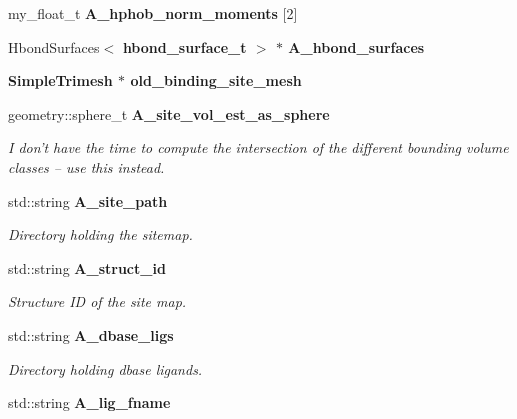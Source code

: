 \begin{CompactItemize}
\item 
my\_\-float\_\-t \textbf{A\_\-hphob\_\-norm\_\-moments} [2]\label{classASCbase_1_1Sitemap_710b85700b6359566aa94d1cb3b23ad0}

\item 
Hbond\-Surfaces$<$ \bf{hbond\_\-surface\_\-t} $>$ $\ast$ \textbf{A\_\-hbond\_\-surfaces}\label{classASCbase_1_1Sitemap_746f37a116532d40ebfb917405f79f56}

\item 
\bf{Simple\-Trimesh} $\ast$ \textbf{old\_\-binding\_\-site\_\-mesh}\label{classASCbase_1_1Sitemap_67d0c9dd4ca44665912f7927effd2478}

\item 
geometry::sphere\_\-t \bf{A\_\-site\_\-vol\_\-est\_\-as\_\-sphere}\label{classASCbase_1_1Sitemap_d868aaadd592ee46383e0ab2e9cc9350}

\begin{CompactList}\small\item\em I don't have the time to compute the intersection of the different bounding volume classes -- use this instead. \item\end{CompactList}\item 
std::string \bf{A\_\-site\_\-path}\label{classASCbase_1_1Sitemap_f9703909778c885c912a1415910f988f}

\begin{CompactList}\small\item\em Directory holding the sitemap. \item\end{CompactList}\item 
std::string \bf{A\_\-struct\_\-id}\label{classASCbase_1_1Sitemap_1355b26f18d6bd22405fc2ed95543b68}

\begin{CompactList}\small\item\em Structure ID of the site map. \item\end{CompactList}\item 
std::string \bf{A\_\-dbase\_\-ligs}\label{classASCbase_1_1Sitemap_f759f963ef40e2d5b8bfe0805f70e2f8}

\begin{CompactList}\small\item\em Directory holding dbase ligands. \item\end{CompactList}\item 
std::string \bf{A\_\-lig\_\-fname}\label{classASCbase_1_1Sitemap_8687cc1a0a4f3c900d40bc3b3ba7b4bb}


\end{CompactItemize}
